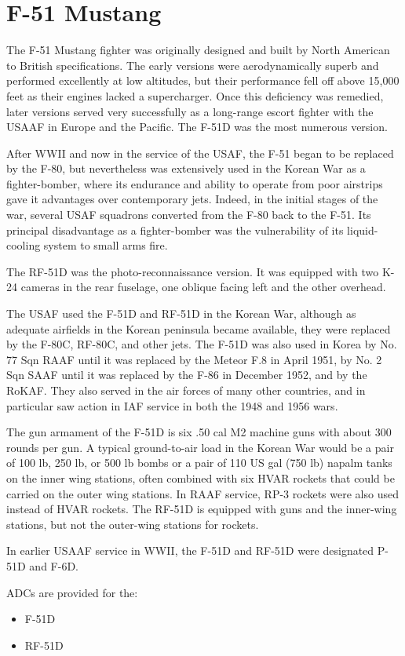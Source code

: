 \section*{F-51 Mustang}


The F-51 Mustang fighter was originally designed and built by North American to British specifications. The early versions were aerodynamically superb and performed excellently at low altitudes, but their performance fell off above 15,000 feet as their engines lacked a supercharger. Once this deficiency was remedied, later versions served very successfully as a long-range escort fighter with the USAAF in Europe and the Pacific. The F-51D was the most numerous version.

After WWII and now in the service of the USAF, the F-51 began to be replaced by the F-80, but nevertheless was extensively used in the Korean War as a fighter-bomber, where its endurance and ability to operate from poor airstrips gave it advantages over contemporary jets. Indeed, in the initial stages of the war, several USAF squadrons converted from the F-80 back to the F-51. Its principal disadvantage as a fighter-bomber was the vulnerability of its liquid-cooling system to small arms fire.

The RF-51D was the photo-reconnaissance version. It was equipped with two K-24 cameras in the rear fuselage, one oblique facing left and the other overhead. 

The USAF used the F-51D and RF-51D in the Korean War, although as adequate airfields in the Korean peninsula became available, they were replaced by the F-80C, RF-80C, and other jets. The F-51D was also used in Korea by No. 77 Sqn RAAF until it was replaced by the Meteor F.8 in April 1951, by No. 2 Sqn SAAF until it was replaced by the F-86 in December 1952, and by the RoKAF. They also served in the air forces of many other countries, and in particular saw action in IAF service in both the 1948 and 1956 wars. 

The gun armament of the F-51D is six .50 cal M2 machine guns with about 300 rounds per gun. A typical ground-to-air load in the Korean War would be a pair of 100 lb, 250 lb, or 500 lb bombs or a pair of 110 US gal (750 lb) napalm tanks on the inner wing stations, often combined with six HVAR rockets that could be carried on the outer wing stations. In RAAF service, RP-3 rockets were also used instead of HVAR rockets. The RF-51D is equipped with guns and the inner-wing stations, but not the outer-wing stations for rockets.

In earlier USAAF service in WWII, the F-51D and RF-51D were designated P-51D and F-6D.

ADCs are provided for the:
\begin{itemize}
\item F-51D
\item RF-51D
\end{itemize}

